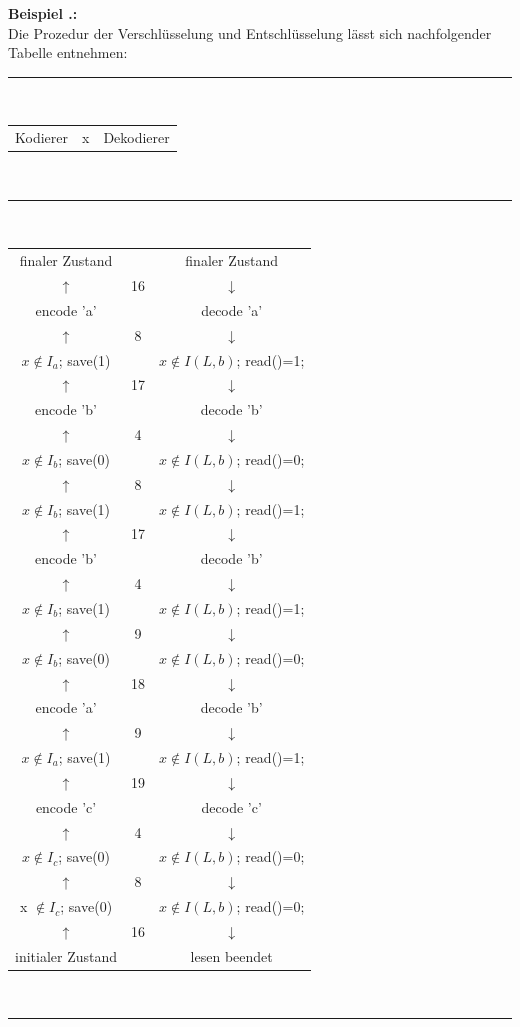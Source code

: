 \documentclass[a4paper,12pt]{article}
\newcounter{Beispiel}
\newenvironment{Beispiel}{
\medskip
        
        \setlength{\parindent}{0pt}
        \addtocounter{Beispiel}{1}
        \textbf{\textsf{Beispiel \thesubsection.\theBeispiel}:}\\}{
        \nopagebreak
        \vspace{-1.0ex}
        \bigskip
        
}
\begin{document}
\begin{Beispiel}
Die Prozedur der Verschlüsselung und Entschlüsselung lässt sich nachfolgender Tabelle entnehmen:
\begin{center}
{\color{gray!50!blue}\rule{8cm}{0.5mm}}
\\
\begin{tabular}{c c c}
Kodierer & x & Dekodierer
\end{tabular}
\vspace{-0.2cm}
\\
{\color{gray!50!blue}\rule{8cm}{0.1mm}}
\\
\begin{tabular}{c c c}
finaler Zustand & & finaler Zustand
\\
$\uparrow$ & 16 & $\downarrow$
\\
encode 'a' & & decode 'a'
\\
$\uparrow$ & 8 & $\downarrow$
\\
$x \not\in I_{a}$; save(1) &  & $x\not\in I(L,b)$; read()=1;
\\
$\uparrow$ & 17 & $\downarrow$
\\
encode 'b' & & decode 'b'
\\
$\uparrow$ & 4 & $\downarrow$ 
\\
$x \not\in I_{b}$; save(0) &  & $x\not\in I(L,b)$; read()=0;
\\
$\uparrow$ & 8 & $\downarrow$
\\
$x \not\in I_{b}$; save(1) &  &$x\not\in I(L,b)$; read()=1;
\\
$\uparrow$ & 17 & $\downarrow$
\\
encode 'b' & & decode 'b'
\\
$\uparrow$ & 4 & $\downarrow$
\\
$x \not\in I_{b}$; save(1) &  &$x\not\in I(L,b)$; read()=1;
\\
$\uparrow$ & 9 & $\downarrow$
\\
$x \not\in I_{b}$; save(0) &  &$x\not\in I(L,b)$; read()=0;
\\
$\uparrow$ & 18 & $\downarrow$
\\
encode 'a' & & decode 'b'
\\
$\uparrow$ & 9 & $\downarrow$
\\
$x \not\in I_{a}$; save(1) &  & $x\not\in I(L,b)$; read()=1;
\\
$\uparrow$ & 19 & $\downarrow$
\\
encode 'c' & & decode 'c'
\\
$\uparrow$ & 4 & $\downarrow$
\\
$x \not\in I_{c}$; save(0) &  & $x\not\in I(L,b)$; read()=0;
\\
$\uparrow$ & 8 & $\downarrow$
\\
x $\not\in I_{c}$; save(0) &  & $x\not\in I(L,b)$; read()=0;
\\
$\uparrow$ & 16  & $\downarrow$
\\
initialer Zustand & & lesen beendet
\end{tabular}
\\
{\color{gray!50!red}\rule{8cm}{0.1mm}}
\end{center}
\end{Beispiel}
\end{document}
